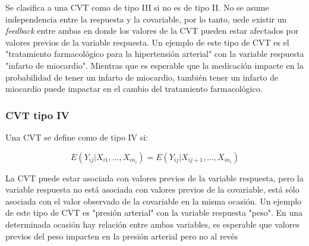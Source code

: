 \documentclass[12pt]{article}
\begin{document}
Se clasifica a una CVT como de tipo III si no es de tipo II. No se asume independencia entre la respuesta y la covariable,
por lo tanto, uede existir un \emph{feedback} entre ambas en donde los valores de la CVT pueden estar afectados por
valores previos de la variable respuesta. Un ejemplo de este tipo de CVT es el "tratamiento farmacológico para la
hipertensión arterial" con la variable respuesta "infarto de miocardio". Mientras que es esperable que la medicación
impacte en la probabilidad de tener un infarto de miocardio, también tener un infarto de miocardio puede impactar
en el cambio del tratamiento farmacológico.

\subsubsection{CVT tipo IV}

Una CVT se define como de tipo IV si:

\begin{equation}
	\label{CVT tipo IV}
	E(Y_{ij}|X_{i1}, ..., X_{in_i}) = E(Y_{ij}|X_{ij+1}, ..., X_{in_i})
\end{equation}

La CVT puede estar asociada con valores previos de la variable respuesta, pero la variable respuesta no está asociada
con valores previos de la covariable, está sólo asociada con el valor observado de la covariable en la misma ocasión.
Un ejemplo de este tipo de CVT es "presión arterial" con la variable respuesta "peso". En una determinada ocasión hay
relación entre ambas variables, es esperable que valores previos del peso impacten en la presión arterial pero no al revés
\end{document}
